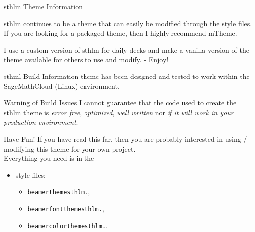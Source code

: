 \documentclass[newPxFont,numfooter,sectionpages]{beamer}
\begin{document}
\begin{frame}[c]{sthlm Theme Information}
	
\alert{sthlm} continues to be a theme that can easily be modified through the style files.  If you are looking for a packaged theme, then I highly recommend \alert{mTheme}.\\

\vspace{1em}

I use a custom version of \alert{sthlm} for daily decks and make a vanilla version of the theme available for others to use and modify. - Enjoy!

\end{frame}


\begin{frame}[c]{sthml Build Information}
 theme has been designed and tested to work within the SageMathCloud (Linux) environment.\\

\vspace{1em}

\begin{alertblock}{Warning of Build Issues}
I cannot guarantee that the code used to create the sthlm theme is \emph{error free}, \emph{optimized}, \emph{well written} nor \emph{if it will work in your production environment}.
\end{alertblock}


\end{frame}


\begin{frame}[c]{Have Fun!}
If you have read this far, then you are probably interested in using / modifying this theme for your own project. \\
\vspace{1em}
Everything you need is in the

\begin{itemize}
	\item style files:
	\begin{itemize}
		\item \texttt{beamerthemesthlm.},
		\item \texttt{beamerfontthemesthlm.},
		\item \texttt{beamercolorthemesthlm.}.
	\end{itemize}
\end{itemize}

\end{frame}
\end{document}
